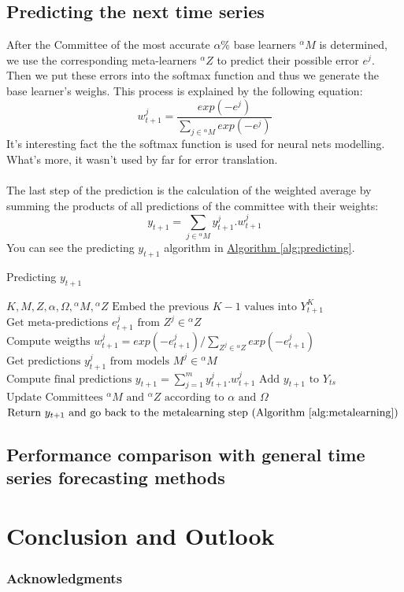 \documentclass[runningheads,a4paper]{llncs}[2015/06/24]
\begin{document}
\subsection{Predicting the next time series}
 After the Committee of the most accurate $\alpha$\% base learners ${}^{\alpha}M$  is determined, we use the corresponding meta-learners ${}^{\alpha}Z$ to predict their possible error $e^j$. Then we put these errors into the softmax function and thus we generate the base learner's weighs\cite{VtorCerqueira2017}. This process is explained by the following equation:
 \begin{equation}
w^{j}_{t+1} = \frac{exp(-e^{j})}{\sum_{j \in {}^{\alpha}M} exp(-e^{j})}
\end{equation} It's interesting fact the the softmax function is used for neural nets modelling. What's more, it wasn't used by far for error translation.\\\\ The last step of the prediction is the calculation of the weighted average by summing the products of all predictions of the committee with their weights:
 \begin{equation}
y_{t+1} = \sum_{j \in {}^{\alpha}M} y^{j}_{t+1}.w^{j}_{t+1}
\end{equation}You can see the predicting $y_{t+1}$ algorithm in \hyperref[alg:predicting]{Algorithm  \ref{alg:predicting}}.


\begin{algorithm}[h]
\caption{Predicting $y_{t+1}$}
\label{alg:predicting}
\begin{algorithmic}[1]
\Require $K, M, Z,\alpha, \Omega, {}^{\alpha}M, {}^{\alpha}Z$
\State $\text{Embed the previous $K-1$ values  into $Y_{t+1}^{K}$}$
\State $\text{Get meta-predictions $e^{j}_{t+1}$ from $Z^{j} \in {}^{\alpha}Z$}$
\State $\text{Compute weigths $w^{j}_{t+1} =  exp(-e^{j}_{t+1})/\sum_{Z^{j} \in {}^{\alpha}Z} exp(-e^{j}_{t+1})$}$
\State $\text{Get predictions $y^{j}_{t+1} $ from models $M^{j} \in {}^{\alpha}M$}$
\State $\text{Compute final predictions $y_{t+1} = \sum_{j=1}^{m} y^{j}_{t+1}.w^{j}_{t+1}$}$
\State $\text{Add $y_{t+1}$ to $Y_{ts}$}$
\State $\text{Update Committees ${}^{\alpha}M$ and ${}^{\alpha}Z$ according to $\alpha$ and $\Omega$}$
\State $\text{Return $y_{t+1}$ and go back to the metalearning step (Algorithm \ref{alg:metalearning})}$
\end{algorithmic}
\end{algorithm}
\subsection{Performance comparison with general time series forecasting methods}

\section{Conclusion and Outlook}

\subsubsection{Acknowledgments}




\end{document}
